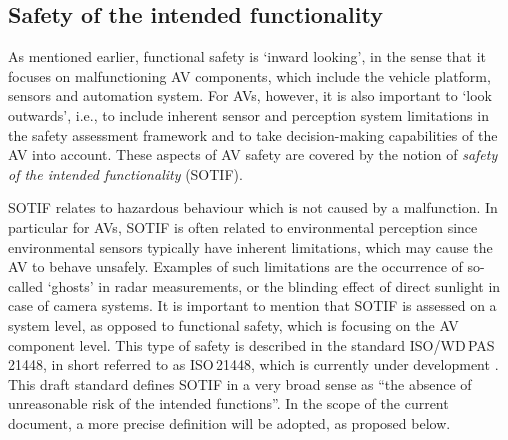 
\subsection{Safety of the intended functionality}
\label{sec:sotif}


As mentioned earlier, functional safety is `inward looking', in the sense that it focuses on malfunctioning AV components, which include the vehicle platform, sensors and automation system. For AVs, however, it is also important to `look outwards', i.e., to include inherent sensor and perception system limitations in the safety assessment framework and to take decision-making capabilities of the AV into account. These aspects of AV safety are covered by the notion of \emph{safety of the intended functionality} (SOTIF).

SOTIF relates to hazardous behaviour which is not caused by a malfunction. In particular for AVs, SOTIF is often related to environmental perception \cite{Fischer2017} since environmental sensors typically have inherent limitations, which may cause the AV to behave unsafely. Examples of such limitations are the occurrence of so-called `ghosts' in radar measurements, or the blinding effect of direct sunlight in case of camera systems. It is important to mention that SOTIF is assessed on a system level, as opposed to functional safety, which is focusing on the AV component level. This type of safety is described in the standard ISO/WD\,PAS\,21448, in short referred to as ISO\,21448, which is currently under development \cite{ISO21448}. This draft standard defines SOTIF in a very broad sense as ``the absence of unreasonable risk of the intended functions''. In the scope of the current document, a more precise definition will be adopted, as proposed below. 

